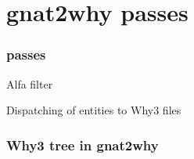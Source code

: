 \documentclass{beamer}
\newenvironment{specialframe}{%
  \begin{frame}[fragile,environment=specialframe]}{\end{frame}}
\begin{document}


\section{gnat2why passes}

\begin{specialframe}\frametitle{passes}

\begin{block}{Alfa filter}

\end{block}

\begin{block}{Dispatching of entities to Why3 files}

\end{block}

\end{specialframe}

\begin{specialframe}\frametitle{Why3 tree in gnat2why}
\end{specialframe}
\end{document}
